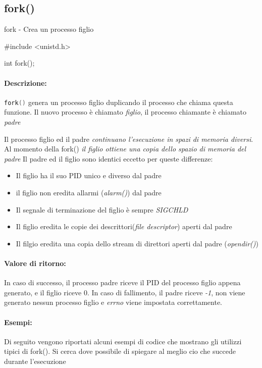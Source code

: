\documentclass
[10pt,        %
 a4paper,     %
 onecolumn,   %
 fleqn,       %
 twoside,     %
 notitlepage, %
 openany      %
]{article}    %
\begin{document}
\subsection{fork()}
fork - Crea un processo figlio
\begin{C}
    #include <unistd.h>

    int fork();
\end{C}
\paragraph{Descrizione:}
\lstinline[language=C]!fork()! genera un processo figlio duplicando il processo che chiama questa funzione.
Il nuovo processo è chiamato \textit{figlio}, il processo chiamante è chiamato \textit{padre}

Il processo figlio ed il padre \textit{continuano l'esecuzione in spazi di memoria diversi}. Al momento della fork() \textit{il figlio ottiene una copia dello spazio di memoria del padre}
Il padre ed il figlio sono identici eccetto per queste differenze:
\begin{itemize}
    \item Il figlio ha il suo PID unico e diverso dal padre
    \item il figlio non eredita allarmi (\textit{alarm()}) dal padre
    \item Il segnale di terminazione del figlio è sempre \textit{SIGCHLD}
    \item Il figlio eredita le copie dei descrittori(\textit{file descriptor}) aperti dal padre
    \item Il filgio eredita una copia dello stream di direttori aperti dal padre (\textit{opendir()})
\end{itemize}
\paragraph{Valore di ritorno:}
In caso di successo, il processo padre riceve il PID del processo figlio appena generato, e il figlio riceve 0. 
In caso di fallimento, il padre riceve \textit{-1}, non viene generato nessun processo figlio e \textit{errno} viene impostata correttamente.
\paragraph{Esempi:}
Di seguito vengono riportati alcuni esempi di codice che mostrano gli utilizzi tipici di fork(). Si cerca dove possibile di spiegare al meglio cio che succede durante l'esecuzione
\end{document}
